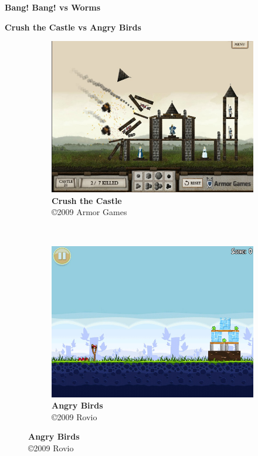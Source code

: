 \expandafter\documentclass\expandafter[table, usenames, svgnames, dvipsnames, \classopts]{beamer}
\begin{document}
\begin{frame}{\textbf{Bang! Bang! vs Worms}}

\end{frame}

\begin{frame}{\textbf{Crush the Castle vs Angry Birds}}

	\begin{figure}
	    \centering

	    \begin{subfigure}[!h]{0.4\paperwidth}
	    	\centering
	    	\includegraphics[draft,height=0.4\paperheight]{crush-castle-screenshot}
	        \caption{\scriptsize\textbf{Crush the Castle}\\\copyright{2009} Armor Games\footnotemark{}}
	    \end{subfigure}
	    ~
		\begin{subfigure}[!h]{0.4\paperwidth}
			\centering
	        \includegraphics[draft,height=0.4\paperheight]{angry-birds-screenshot}
	        \caption{\scriptsize\textbf{Angry Birds}\\\copyright{2009} Rovio\footnotemark{}}
	    \end{subfigure}
    \end{figure}


\end{frame}
\end{document}
